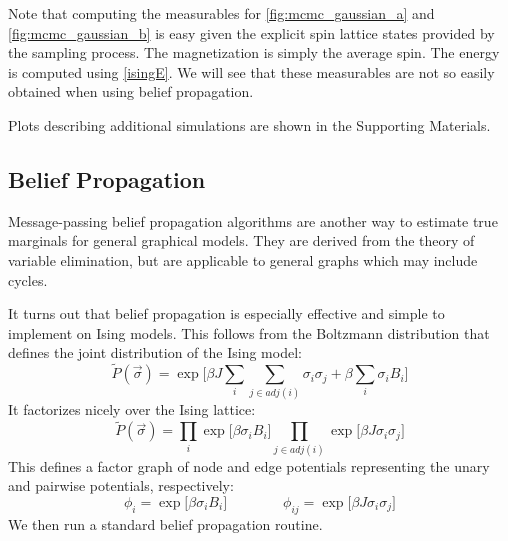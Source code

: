 \documentclass{article}
\begin{document}
Note that computing the measurables for \ref{fig:mcmc_gaussian_a} and 
\ref{fig:mcmc_gaussian_b} is easy given the explicit spin lattice states 
provided by the sampling process. 
The magnetization is simply the average spin. 
The energy is computed using \ref{isingE}. 
We will see that these measurables are not so easily obtained when using belief 
propagation. 

Plots describing additional simulations are shown in the Supporting Materials. 





\subsection{Belief Propagation}





Message-passing belief propagation algorithms are another way to estimate true 
marginals for general graphical models. 
They are derived from the theory of variable elimination, but are applicable to 
general graphs which may include cycles. 

It turns out that belief propagation is especially effective and simple to 
implement on Ising models. 
This follows from the Boltzmann distribution that defines the joint distribution 
of the Ising model:
\begin{equation}\label{isingJoint}
    \tilde{P}(\vec{\sigma}) = \exp \Bigr [\beta J\sum_i \sum_{j \in adj(i)} \sigma_i \sigma_j + \beta \sum_i \sigma_i B_i \Bigr ]
\end{equation}
It factorizes nicely over the Ising lattice:
\begin{equation}\label{gibbsFactorization}
    \tilde{P}(\vec{\sigma}) = \prod_i \exp \Bigr [\beta \sigma_i B_i \Bigr ] \prod_{j \in adj(i)} \exp \Bigr [ \beta J \sigma_i \sigma_j \Bigr ]
\end{equation}
This defines a factor graph of node and edge potentials representing the unary 
and pairwise potentials, respectively:
\[
    \phi_i = \exp \Bigr [\beta \sigma_i B_i \Bigr ]
    \qquad \qquad
    \phi_{ij} = \exp \Bigr [ \beta J \sigma_i \sigma_j \Bigr ]
\]
We then run a standard belief propagation routine. 
\end{document}
